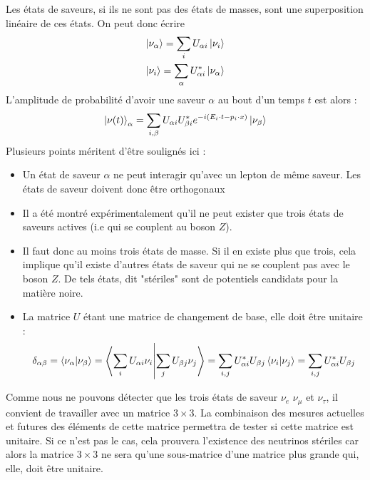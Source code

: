             Les états de saveurs, si ils ne sont pas des états de masses, sont une superposition linéaire de ces états. On peut donc écrire
            \begin{eqnarray}
            \ket{\nu_{\alpha}} = \sum_i U_{\alpha i}\ket{\nu_i}\label{eq::alphatoi} \\
            \ket{\nu_i} = \sum_{\alpha} U_{\alpha i}^*\ket{\nu_{\alpha}}
            \end{eqnarray}
            L'amplitude de probabilité d'avoir une saveur $\alpha$ au bout d'un temps $t$ est alors :
            \begin{equation}
                \ket{\nu(t)}_{\alpha} = \sum_{i,\beta} U_{\alpha i}U_{\beta i}^* e^{-i(E_i \cdot t - p_i\cdot x)}\ket{\nu_{\beta}}
            \end{equation}
            Plusieurs points méritent d'être soulignés ici :
            \begin{itemize}
                \item Un état de saveur $\alpha$ ne peut interagir qu'avec un lepton de même saveur. Les états de saveur doivent donc être orthogonaux
                \item Il a été montré expérimentalement qu'il ne peut exister que trois états de saveurs actives (i.e qui se couplent au boson $Z$)\cite{pdg2018}.
                \item Il faut donc au moins trois états de masse. Si il en existe plus que trois, cela implique qu'il existe d'autres états de saveur qui ne se couplent pas avec le boson $Z$. De tels états, dit "stériles" sont de potentiels candidats pour la matière noire.
                \item La matrice $U$ étant une matrice de changement de base, elle doit être unitaire :
                \begin{equation*}
                    \delta_{\alpha\beta} = \braket{\nu_{\alpha}}{\nu_{\beta}} = \braket{\sum_i U_{\alpha i}\nu_i}{\sum_j U_{\beta j}\nu_j} = \sum_{i,j} U_{\alpha i}^*U_{\beta j} \braket{\nu_i}{\nu_j} = \sum_{i,j} U_{\alpha i}^*U_{\beta j}
                \end{equation*}
            \end{itemize}
            Comme nous ne pouvons détecter que les trois états de saveur $\nu_e$ $\nu_{\mu}$ et $\nu_{\tau}$, il convient de travailler avec un matrice $3\times3$. La combinaison des mesures actuelles et futures des éléments de cette matrice \cite{Qian2013} permettra de tester si cette matrice est unitaire. Si ce n'est pas le cas, cela prouvera l'existence des neutrinos stériles car alors la matrice $3\times3$ ne sera qu'une sous-matrice d'une matrice plus grande qui, elle, doit être unitaire.
            
